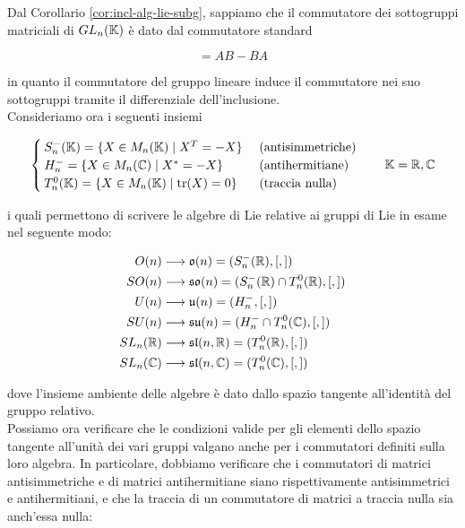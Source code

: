 Dal Corollario \ref{cor:incl-alg-lie-subg}, sappiamo che il commutatore dei sottogruppi matriciali di $ GL_{n}(\mathbb{K}) $ è dato dal commutatore standard

\begin{equation}
	[A,B] = AB - BA
\end{equation}

in quanto il commutatore del gruppo lineare induce il commutatore nei suo sottogruppi tramite il differenziale dell'inclusione.\\
Consideriamo ora i seguenti insiemi

\begin{equation}
	\begin{cases}
		S^{-}_{n}(\K) = \{ X \in M_{n}(\K) \mid X^{T} = - X \} & \text{ (antisimmetriche)} \\
		H^{-}_{n} = \{ X \in M_{n}(\C) \mid X^{*} = - X \} & \text{ (antihermitiane)} \\
		T^{0}_{n}(\K) = \{ X \in M_{n}(\K) \mid \tr(X) = 0 \} & \text{ (traccia nulla)}
	\end{cases} %
	\qquad \K = \R, \C
\end{equation}

i quali permettono di scrivere le algebre di Lie relative ai gruppi di Lie in esame nel seguente modo:

\begin{align}
	O(n) &\longrightarrow \mathfrak{o}(n) = (S^{-}_{n}(\mathbb{R}),[,]) \\
	SO(n) &\longrightarrow \mathfrak{so}(n) = (S^{-}_{n}(\mathbb{R}) \cap T^{0}_{n}(\mathbb{R}),[,]) \\
	U(n) &\longrightarrow \mathfrak{u}(n) = (H^{-}_{n},[,]) \\
	SU(n) &\longrightarrow \mathfrak{su}(n) = (H^{-}_{n} \cap T^{0}_{n}(\mathbb{C}),[,]) \\
	SL_{n}(\mathbb{R}) &\longrightarrow \mathfrak{sl}(n,\mathbb{R}) = (T^{0}_{n}(\mathbb{R}),[,]) \\
	SL_{n}(\mathbb{C}) &\longrightarrow \mathfrak{sl}(n,\mathbb{C}) = (T^{0}_{n}(\mathbb{C}),[,])
\end{align}

dove l'insieme ambiente delle algebre è dato dallo spazio tangente all'identità del gruppo relativo.\\
Possiamo ora verificare che le condizioni valide per gli elementi dello spazio tangente all'unità dei vari gruppi valgano anche per i commutatori definiti sulla loro algebra. In particolare, dobbiamo verificare che i commutatori di matrici antisimmetriche e di matrici antihermitiane siano rispettivamente antisimmetrici e antihermitiani, e che la traccia di un commutatore di matrici a traccia nulla sia anch'essa nulla:


